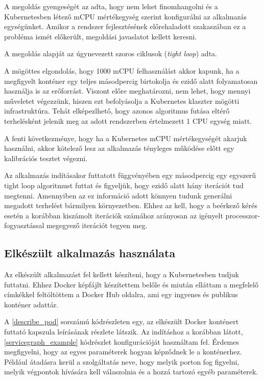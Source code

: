 A megoldás gyengeségét az adta, hogy nem lehet finomhangolni és a Kubernetesben létező mCPU mértékegység szerint konfigurálni az alkalmazás egységünket.
Amikor a rendszer fejlesztésének előrehaladott szakaszában ez a probléma ismét előkerült, megoldási javaslatot kellett keresni.

A megoldás alapját az úgynevezett szoros ciklusok (\textit{tight loop}\citep{tightLoop}) adta.

A mögöttes elgondolás, hogy 1000 mCPU felhasználást akkor kapunk, ha a megfigyelt konténer egy teljes másodpercig birtokolja és ezidő alatt folyamatosan használja is az erőforrást.
Viszont előre meghatározni, nem lehet, hogy mennyi műveletet végezzünk, hiszen ezt befolyásolja a Kubernetes klaszter mögötti infrastruktúra.
Tehát elképezlhető, hogy azonos algoritmus futása eltérő terhelésként jelenik meg az adott rendszerben értelmezett 1 CPU egység miatt.

A fenti következménye, hogy ha a Kubernetes mCPU mértékegységét akarjuk használni, akkor kötelező lesz az alkalmazás tényleges működése előtt egy kalibrációs tesztet végezni.

Az alkalmazás indításakor futtatott függvényében egy másodpercig egy egyszerű tight loop algoritmust futtat és figyeljük, hogy ezidő alatt hány iterációt tud megtenni.
Amennyiben az ez információ adott könnyen tudunk generálni megadott terhelést bármilyen környezetben.
Ehhez az kell, hogy a beérkező kérés esetén a korábban kiszámolt iterációk számához arányosan az igényelt processzor-fogyasztással megegyező iterációt tegyen meg.

\subsection{Elkészült alkalmazás használata}
Az elkészült alkalmazást fel kellett készíteni, hogy a Kubernetesben tudjuk futtatni. Ehhez Docker képfájlt készítettem belőle és miután elláttam a megfelelő címkékkel feltöltöttem\citep{dockerContainer} a Docker Hub oldalra, ami egy ingyenes és publikus konténer adattár. \\

\lstset{caption=Kénténer futtatása és válasza, label=describe_pod}


A \ref{describe_pod} sorszámú kódrészleten egy, az elkészült Docker konténert futtató kapszula leírásának részlete látszik. Az indításhoz a korábban látott, \ref{servicegraph_example} kódrészlet konfigurációját használtam fel. Érdemes megfigyelni, hogy az egyes  paraméterek hogyan képződnek le a konténerhez. Például átadásra kerül a szolgáltatás neve, hogy melyik porton fog figyelni, melyik végpontok hívására kell válaszolnia és a hozzá tartozó egyéb paraméterek.

